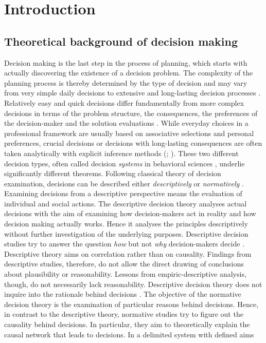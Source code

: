 
\chapter{Introduction}
\label{chap:intro}
\newpage
\section{Theoretical background of decision making}
\label{sec:intro:bg}
Decision making is the last step in the process of planning, which starts with actually discovering the existence of a decision problem. The complexity of the planning process is thereby determined by the type of decision and may vary from very simple daily decisions to extensive and long-lasting decision processes \citep[p. 3-4]{kangas_2015}. Relatively easy and quick decisions differ fundamentally from more complex decisions in terms of the problem structure, the consequences, the preferences of the decision-maker and the solution evaluations \citep[p. 807-808]{keeney_1982}. While everyday choices in a professional framework are usually based on associative selections and personal preferences, crucial decisions or decisions with long-lasting consequences are often taken analytically with explicit inference methods (\citealp[p. 659, 672]{stanovich_2000}; \citealp[p. 3]{kangas_2015}). These two different decision types, often called decision \textit{systems} in behavioral sciences \citep[e.g.][p. 658]{stanovich_2000}, underlie significantly different theorems. Following classical theory of decision examination, decisions can be described either \textit{descriptively} or \textit{normatively} \citep[p. 6]{bitz_2005}. Examining decisions from a descriptive perspective means the evaluation of individual and social actions. The descriptive decision theory analyses actual decisions with the aim of examining how decision-makers act in reality and how decision making actually works. Hence it analyses the principles descriptively without further investigation of the underlying purposes. Descriptive decision studies try to answer the question \textit{how} but not \textit{why} decision-makers decide \citep[p. 499-501]{simon_1979}. Descriptive theory aims on correlation rather than on causality. Findings from descriptive studies, therefore, do not allow the direct drawing of conclusions about plausibility or reasonability. Lessons from empiric-descriptive analysis, though, do not necessarily lack reasonability. Descriptive decision theory does not inquire into the rationale behind decisions \citep[p. 500]{simon_1979}. The objective of the normative decision theory is the examination of particular reasons behind decisions. Hence, in contrast to the descriptive theory, normative studies try to figure out the causality behind decisions. In particular, they aim to theoretically explain the causal network that leads to decisions. In a delimited system with defined aims 